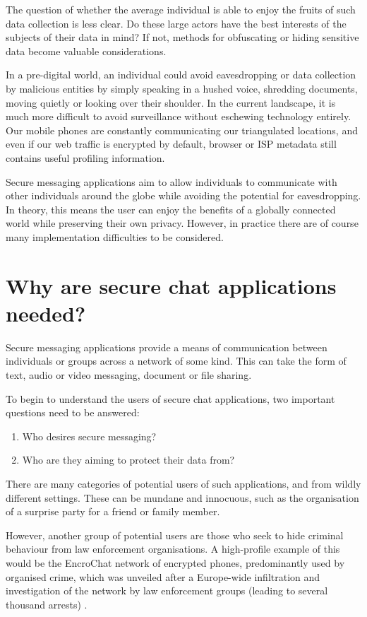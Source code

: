 \documentclass{mproj}
\begin{document}
The question of whether the average individual is able to enjoy the fruits of such data collection is less clear. Do these large actors have the best interests of the subjects of their data in mind? If not, methods for obfuscating or hiding sensitive data become valuable considerations.

In a pre-digital world, an individual could avoid eavesdropping or data collection by malicious entities by simply speaking in a hushed voice, shredding documents, moving quietly or looking over their shoulder. In the current landscape, it is much more difficult to avoid surveillance without eschewing technology entirely. Our mobile phones are constantly communicating our triangulated locations, and even if our web traffic is encrypted by default, browser or ISP metadata still contains useful profiling information.

Secure messaging applications aim to allow individuals to communicate with other individuals around the globe while avoiding the potential for eavesdropping. In theory, this means the user can enjoy the benefits of a globally connected world while preserving their own privacy. However, in practice there are of course many implementation difficulties to be considered.

\section{Why are secure chat applications needed?}
Secure messaging applications provide a means of communication between individuals or groups across a network of some kind. This can take the form of text, audio or video messaging, document or file sharing.

To begin to understand the users of secure chat applications, two important questions need to be answered:
\begin{enumerate}
	\item Who desires secure messaging?
	\item Who are they aiming to protect their data from?
\end{enumerate}

There are many categories of potential users of such applications, and from wildly different settings. These can be mundane and innocuous, such as the organisation of a surprise party for a friend or family member. 

However, another group of potential users are those who seek to hide criminal behaviour from law enforcement organisations. A high-profile example of this would be the EncroChat network of encrypted phones, predominantly used by organised crime, which was unveiled after a Europe-wide infiltration and investigation of the network by law enforcement groups (leading to several thousand arrests) \cite{sommer2022evidence}. 
\end{document}
